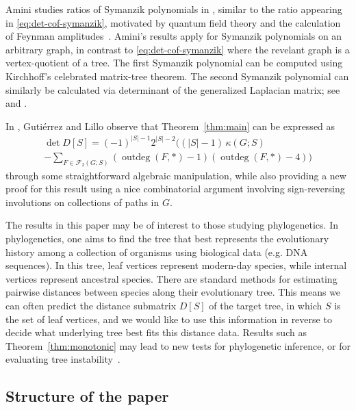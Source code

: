 \documentclass[12pt]{amsart}
\theoremstyle{definition}
\newcommand{\forests}{\mathcal{F}}
\DeclareMathOperator{\outdeg}{outdeg}
\begin{document}

Amini studies ratios of Symanzik polynomials in \cite{amini}, similar to the ratio appearing in \eqref{eq:det-cof-symanzik}, motivated by quantum field theory and the calculation of Feynman amplitudes~\cite{amini-bloch-etal}.
Amini's results apply for Symanzik polynomials on an arbitrary graph, in contrast to \eqref{eq:det-cof-symanzik} where the revelant graph is a vertex-quotient of a tree.
The first Symanzik polynomial can be computed using Kirchhoff's celebrated matrix-tree theorem.
The second Symanzik polynomial can similarly be calculated via determinant of the generalized Laplacian matrix; see 
\cite[Section 1.1]{amini} and \cite[Theorem 7.1]{brown}.


In \cite{gutierrez-lillo}, Guti\'{e}rrez and Lillo observe that Theorem~\ref{thm:main} can be expressed as
\begin{multline}
	\det D[S] = (-1)^{|S| - 1} 2^{|S| - 2} \Big( (|S| - 1)\, \kappa(G;S)  \\
	- \!\!\! \sum_{F \in \forests_2(G;S)} \left(\outdeg(F,*) - 1\right)\left(\outdeg(F,*) - 4\right)  \Big)
\end{multline}
through some straightforward algebraic manipulation,
while also providing a new proof for this result using a nice combinatorial argument involving sign-reversing involutions on collections of paths in $G$.

The results in this paper may be of interest to those studying phylogenetics.
In phylogenetics, one aims to find the tree that best represents the evolutionary history among a collection of organisms using biological data (e.g. DNA sequences).
In this tree, leaf vertices represent modern-day species, while internal vertices represent ancestral species.
There are standard methods for estimating pairwise distances between species along their evolutionary tree. 
This means we can often predict the distance submatrix $D[S]$ of the target tree, in which $S$ is the set of leaf vertices, and we would like to use this information in reverse to decide what underlying tree best fits this distance data.
Results such as Theorem~\ref{thm:monotonic} may lead to new tests for phylogenetic inference, or for evaluating tree instability~\cite{collienne-etal}.



\subsection*{Structure of the paper}
\end{document}
